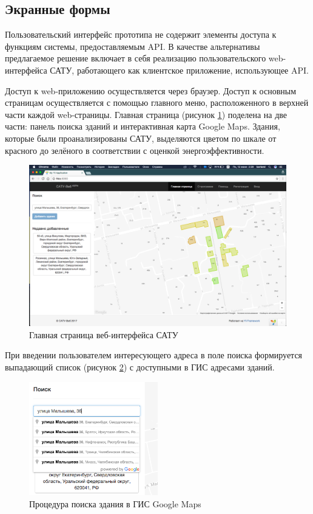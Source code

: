 \subsection{Экранные формы}

	Пользовательский интерфейс прототипа не содержит элементы доступа к функциям системы, предоставляемым API. В качестве альтернативы предлагаемое решение включает в себя реализацию пользовательского web-интерфейса САТУ, работающего как клиентское приложение, использующее API.
 
	Доступ к web-приложению осуществляется через браузер. Доступ к основным страницам осуществляется с помощью главного меню, расположенного в верхней части каждой web-страницы. Главная страница (рисунок \ref{scrshot:main_1}) поделена на две части: панель поиска зданий и интерактивная карта Google Maps. Здания, которые были проанализированы САТУ, выделяются цветом по шкале от красного до зелёного в соответствии с оценкой энергоэффективности.

	\begin{figure}[h!]
		\centering
		\includegraphics[width=1\textwidth]{images/scrshots/main_1}
		\caption{Главная страница веб-интерфейса САТУ}
		\label{scrshot:main_1}
	\end{figure}

	\pagebreak

	При введении пользователем интересующего адреса в поле поиска формируется выпадающий список (рисунок \ref{scrshot:search_field_1}) с доступными в ГИС адресами зданий.

	\begin{figure}[h!]
		\centering
		\includegraphics[width=0.5\textwidth]{images/scrshots/search_field_1}
		\caption{Процедура поиска здания в ГИС Google Maps}
		\label{scrshot:search_field_1}
	\end{figure}

